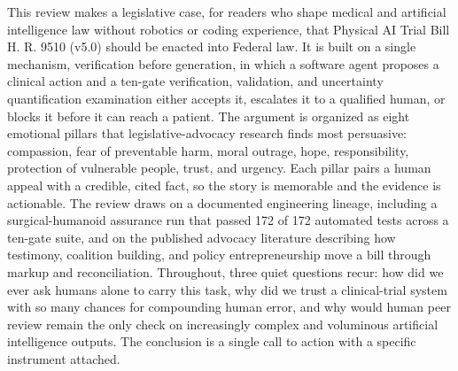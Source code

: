 This review makes a legislative case, for readers who shape medical and
artificial intelligence law without robotics or coding experience, that Physical
AI Trial Bill H. R. 9510 (v5.0) should be enacted into Federal law. It is built
on a single mechanism, verification before generation, in which a software agent
proposes a clinical action and a ten-gate verification, validation, and
uncertainty quantification examination either accepts it, escalates it to a
qualified human, or blocks it before it can reach a patient. The argument is
organized as eight emotional pillars that legislative-advocacy research finds most
persuasive: compassion, fear of preventable harm, moral outrage, hope,
responsibility, protection of vulnerable people, trust, and urgency. Each pillar
pairs a human appeal with a credible, cited fact, so the story is memorable and
the evidence is actionable. The review draws on a documented engineering lineage,
including a surgical-humanoid assurance run that passed 172 of 172 automated tests
across a ten-gate suite, and on the published advocacy literature describing how
testimony, coalition building, and policy entrepreneurship move a bill through
markup and reconciliation. Throughout, three quiet questions recur: how did we
ever ask humans alone to carry this task, why did we trust a clinical-trial system
with so many chances for compounding human error, and why would human peer review
remain the only check on increasingly complex and voluminous artificial
intelligence outputs. The conclusion is a single call to action with a specific
instrument attached.
